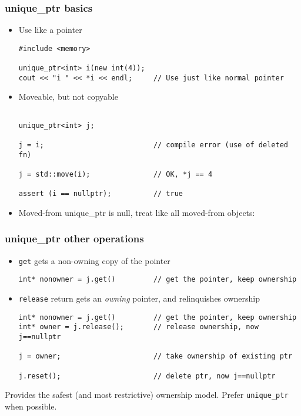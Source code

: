 \begin{frame}[fragile]
\frametitle{unique\_ptr basics}

\begin{itemize}
\item Use like a pointer
{\scriptsize\begin{verbatim}
#include <memory>

unique_ptr<int> i(new int(4));
cout << "i " << *i << endl;     // Use just like normal pointer

\end{verbatim}}
\item Moveable, but not copyable
{\scriptsize\begin{verbatim}

unique_ptr<int> j;

j = i;                          // compile error (use of deleted fn)

j = std::move(i);               // OK, *j == 4

assert (i == nullptr);          // true

\end{verbatim}}
\item Moved-from unique\_ptr is null, treat like all moved-from
  objects:   
\end{itemize}

\end{frame}


\begin{frame}[fragile]
\frametitle{unique\_ptr other operations}

\begin{itemize}
\item \texttt{get} gets a non-owning copy of the pointer
{\scriptsize\begin{verbatim}
int* nonowner = j.get()         // get the pointer, keep ownership

\end{verbatim}}
\item \texttt{release} return gets an \emph{owning} pointer, and
  relinquishes ownership

{\scriptsize\begin{verbatim}
int* nonowner = j.get()         // get the pointer, keep ownership
int* owner = j.release();       // release ownership, now j==nullptr

j = owner;                      // take ownership of existing ptr

j.reset();                      // delete ptr, now j==nullptr
\end{verbatim}}
\end{itemize}

Provides the safest (and most restrictive) ownership model.  Prefer
\texttt{unique\_ptr} when possible.

\end{frame}

